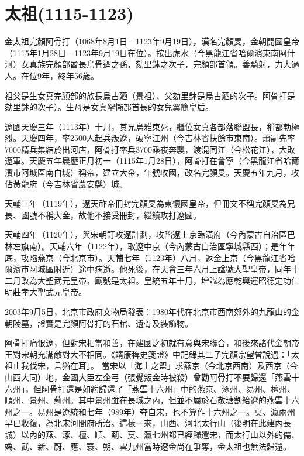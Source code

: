 
\section{太祖\tiny(1115-1123)}

金太祖完顏阿骨打（1068年8月1日－1123年9月19日），漢名完顏旻，金朝開國皇帝（1115年1月28日—1123年9月19日在位）。按出虎水（今黑龍江省哈爾濱東南阿什河）女真族完顏部酋長烏骨迺之孫，劾里鉢之次子，完顏部首領。善騎射，力大過人。在位9年，終年56歲。

祖父是生女真完顔部的族長烏古廼（景祖）、父劾里鉢是烏古廼的次子。阿骨打是劾里鉢的次子）。生母是女真挐懶部首長的女兒翼簡皇后。

遼國天慶三年（1113年）十月，其兄烏雅束死，繼位女真各部落聯盟長，稱都勃極烈。天慶四年，率2500人起兵叛遼，破寧江州（今吉林省扶餘市東南）。蕭嗣先率7000精兵集結於出河店，阿骨打率兵3700乘夜奔襲，渡混同江（今松花江），大敗遼軍。天慶五年農歷正月初一（1115年1月28日），阿骨打在會寧（今黑龍江省哈爾濱市阿城區南白城）稱帝，建立大金，年號收國，改名完顏旻。天慶五年九月，攻佔黃龍府（今吉林省農安縣）城。

天輔三年（1119年），遼天祚帝冊封完顏旻為東懷國皇帝，但冊文不稱完顏旻為兄長、國號不稱大金，故他不接受冊封，繼續攻打遼國。

天輔四年（1120年），與宋朝訂攻遼計劃，攻陷遼上京臨潢府（今內蒙古自治區巴林左旗南）。天輔六年（1122年），取遼中京（今內蒙古自治區寧城縣西）；是年年底，攻陷燕京（今北京市）。天輔七年（1123年）八月，返金上京（今黑龍江省哈爾濱市阿城區附近）途中病逝。他死後，在天會三年六月上諡號大聖皇帝，同年十二月改為大聖武元皇帝，廟號是太祖。皇統五年十月，增諡為應乾興運昭德定功仁明莊孝大聖武元皇帝。

2003年9月5日，北京市政府文物局發表：1980年代在北京市西南郊外的九龍山的金朝陵墓，證實是完顏阿骨打的石棺、遺骨及裝飾物。

阿骨打痛恨遼，但對宋相當和善，在建國之初就有意與宋聯合，和後來諸代金朝帝王對宋朝充滿敵對大不相同。《靖康稗史箋證》中記錄其二子完顏宗望曾說過：「太祖止我伐宋，言猶在耳」。 當宋以「海上之盟」求燕京（今北京西南）及西京（今山西大同）地，金國大臣左企弓（張覺叛金時被殺）曾勸阿骨打不要歸還「燕雲十六州」，但阿骨打還是如約歸還了「燕雲十六州」中的燕京、涿州、易州、檀州、順州、景州、薊州。其中景州雖在長城之內，但並不屬於石敬瑭割給遼的燕雲十六州之一。易州是遼統和七年（989年）夺自宋，也不算作十六州之一。莫、瀛兩州早已收復，為北宋河間府所治。這樣一來，山西、河北太行山（後明在此建內長城）以內的燕、涿、檀、順、薊、莫、瀛七州都已經歸還宋，而太行山以外的儒、媯、武、新、蔚、應、寰、朔、雲九州當時遼金尚在爭奪，金太祖也無法歸還。

